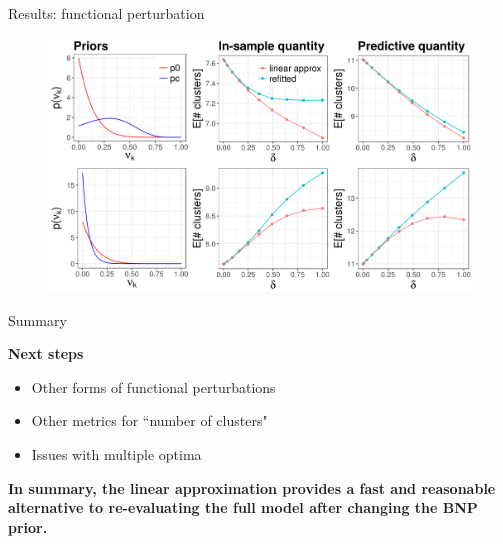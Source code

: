 \documentclass[10pt]{beamer}\usepackage[]{graphicx}\usepackage[]{color}
\newenvironment{knitrout}{}{} %
\begin{document}
\begin{frame}{Results: functional perturbation}
\begin{figure}
\centering

\begin{knitrout}
\color{fgcolor}

{\centering \includegraphics[width=0.98\linewidth,height=0.588\linewidth]{figure/functional_sens_plot_thresh0-1} 

}



\end{knitrout}
\end{figure}

\end{frame}


\begin{frame}{Summary}

{\bf Next steps}
\begin{itemize}
\item Other forms of functional perturbations
\pause 
\item Other metrics for ``number of clusters"
\pause
\item Issues with multiple optima
\pause 
\end{itemize}
\vspace{0.2in}

\begin{mdframed}[style=MyFrame]
\begin{center}
{\bf In summary, the linear approximation provides a fast and reasonable alternative to re-evaluating the full model after changing the BNP prior.}
\end{center}
\end{mdframed}

\end{frame}
\end{document}
